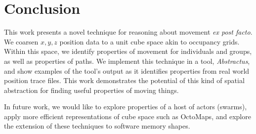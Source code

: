 \section{Conclusion}
\label{sec:conclusion}

This work presents a novel technique for reasoning about movement \emph{ex post facto}.
We coarsen $x,y,z$ position data to a unit cube space akin to occupancy grids.
Within this space, we identify properties of movement for individuals and groups, as well as properties of paths.
We implement this technique in a tool, \emph{Abstractus}, and show examples of the tool's output as it identifies properties from real world position trace files.
This work demonstrates the potential of this kind of spatial abstraction for finding useful properties of moving things.

In future work, we would like to explore properties of a host of actors (swarms), apply more efficient representations of cube space such as OctoMaps, and explore the extension of these techniques to software memory shapes.


